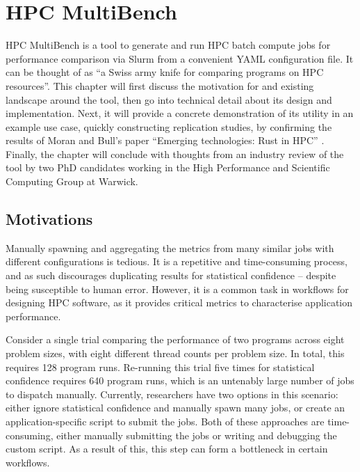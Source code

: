 \chapter{HPC MultiBench}
\label{ch:hpc-multibench}



HPC MultiBench is a tool to generate and run HPC batch compute jobs for performance comparison via Slurm from a convenient YAML configuration file. It can be thought of as ``a Swiss army knife for comparing programs on HPC resources''. This chapter will first discuss the motivation for and existing landscape around the tool, then go into technical detail about its design and implementation. Next, it will provide a concrete demonstration of its utility in an example use case, quickly constructing replication studies, by confirming the results of Moran and Bull's paper ``Emerging technologies: Rust in HPC'' \cite{moranEmergingTechnologiesRust2023}. Finally, the chapter will conclude with thoughts from an industry review of the tool by two PhD candidates working in the High Performance and Scientific Computing Group at Warwick.

\section{Motivations}
\label{sec:hpc-multibench-motivation}

Manually spawning and aggregating the metrics from many similar jobs with different configurations is tedious. It is a repetitive and time-consuming process, and as such discourages duplicating results for statistical confidence -- despite being susceptible to human error. However, it is a common task in workflows for designing \acrshort{HPC} software, as it provides critical metrics to characterise application performance.

Consider a single trial comparing the performance of two programs across eight problem sizes, with eight different thread counts per problem size. In total, this requires 128 program runs. Re-running this trial five times for statistical confidence requires 640 program runs, which is an untenably large number of jobs to dispatch manually. Currently, researchers have two options in this scenario: either ignore statistical confidence and manually spawn many jobs, or create an application-specific script to submit the jobs. Both of these approaches are time-consuming, either manually submitting the jobs or writing and debugging the custom script. As a result of this, this step can form a bottleneck in certain workflows.

